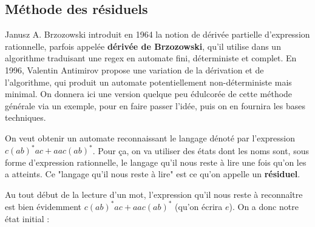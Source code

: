 \subsection{Méthode des résiduels}

Janusz A. Brzozowski introduit en 1964 la notion de dérivée partielle d'expression rationnelle, parfois appelée \textbf{dérivée de Brzozowski}, qu'il utilise dans un algorithme traduisant une regex en automate fini, déterministe et complet. En 1996, Valentin Antimirov propose une variation de la dérivation et de l'algorithme, qui produit un automate potentiellement non-déterministe mais minimal. On donnera ici une version quelque peu édulcorée de cette méthode générale via un exemple, pour en faire passer l'idée, puis on en fournira les bases techniques.


\begin{example}

On veut obtenir un automate reconnaissant le langage dénoté par l'expression $c(ab)^*ac + aac(ab)^*$. Pour ça, on va utiliser des états dont les noms sont, sous forme d'expression rationnelle, le langage qu'il nous reste à lire une fois qu'on les a atteints. Ce "langage qu'il nous reste à lire" est ce qu'on appelle un \textbf{résiduel}.

Au tout début de la lecture d'un mot, l'expression qu'il nous reste à reconnaître est bien évidemment $c(ab)^*ac + aac(ab)^*$ (qu'on écrira $e$). On a donc notre état initial :


\begin{figure}[H]
\centering

\end{figure}


\end{example}
